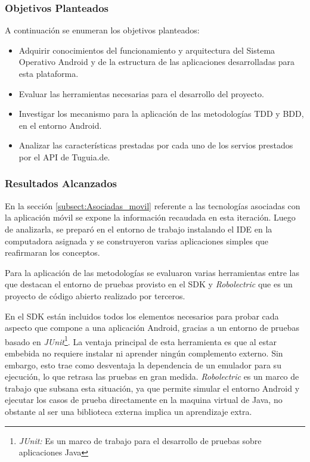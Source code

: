 \subsubsection{Objetivos Planteados}
A continuación se enumeran los objetivos planteados:

\begin{itemize}
\item Adquirir conocimientos del funcionamiento y arquitectura del Sistema Operativo Android y de la estructura de las aplicaciones desarrolladas para esta plataforma.
\item Evaluar las herramientas necesarias para el desarrollo del proyecto.
\item Investigar los mecanismo para la aplicación de las metodologías TDD y BDD, en el entorno Android.
\item Analizar las características prestadas por cada uno de los servios prestados por el API de Tuguia.de. 
\end{itemize}

\subsubsection{Resultados Alcanzados}

En la sección \ref{subsect:Asociadas_movil} referente a las tecnologías asociadas con la aplicación móvil se expone la información recaudada en esta iteración. Luego de analizarla, se preparó en el entorno de trabajo instalando el IDE en la computadora asignada y se  construyeron varias aplicaciones simples que reafirmaran los conceptos.

Para la aplicación de las metodologías se evaluaron varias herramientas entre las que destacan el entorno de pruebas provisto en el SDK y \textit{Robolectric} que es un proyecto de código abierto realizado por terceros.

En el SDK están incluidos todos los elementos necesarios para probar cada aspecto que compone a una aplicación Android, gracias a un entorno de pruebas basado en \textit{JUnit}\footnote{\textit{JUnit:} Es un marco de trabajo para el desarrollo de pruebas sobre aplicaciones Java\cite{JUNIT}}. La ventaja principal de esta herramienta es que al estar embebida no requiere instalar ni aprender ningún complemento externo. Sin embargo, esto trae como desventaja la dependencia de un emulador para su ejecución, lo que retrasa las pruebas en gran medida. \textit{Robolectric} es un marco de trabajo que subsana esta situación, ya que permite simular el entorno Android y ejecutar los casos de prueba directamente en la maquina virtual de Java, no obstante al ser una biblioteca externa implica un aprendizaje extra.

